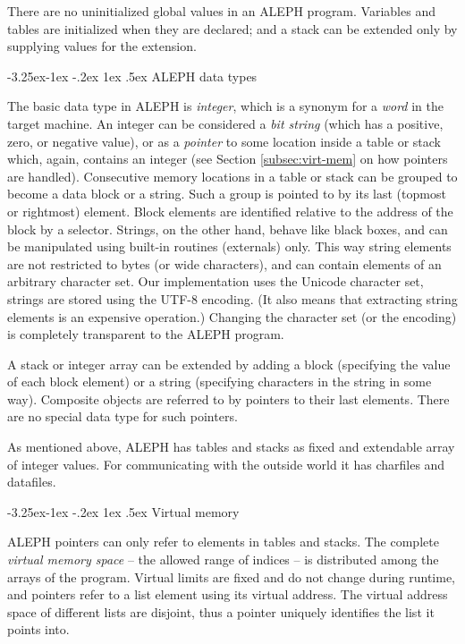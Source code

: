 \documentclass{article}
\makeatletter
\newcommand\A{{\sf ALEPH}}
\newcommand\g[1]{{\sf #1}}
\renewcommand\subsection{%
\@startsection{subsection}{2}{\z@}%
   {-3.25ex\@plus -1ex \@minus -.2ex}%
   {1ex \@plus .5ex}%
   {\normalfont\normalsize\bfseries}}
\makeatother
\begin{document}
There are no uninitialized global values in an \A{} program. Variables and
\g{table}s are initialized when they are declared; and a \g{stack} can be 
extended only by supplying values for the extension.

\subsection{\A{} data types}\label{subsec:blocks}

The basic data type in \A{} is \emph{integer}, which is a synonym for a
\emph{word} in the target machine. An integer can be considered a \emph{bit
string} (which has a positive, zero, or negative value), or as a
\emph{pointer} to some location inside a \g{table} or \g{stack} which,
again, contains an integer (see Section \ref{subsec:virt-mem} on how pointers
are handled). Consecutive memory locations in a \g{table} or \g{stack} can
be grouped to become a data block or a string. Such a group is pointed to by its
last (topmost or rightmost) element. Block elements are identified relative
to the address of the  block by a \g{selector}. Strings, on the other hand, behave
like black boxes, and can be manipulated using built-in routines
(\g{external}s) only. This way string elements are not restricted to bytes
(or wide characters), and can contain elements of an arbitrary character set.
Our implementation uses the Unicode character set, strings are
stored using the UTF-8 encoding. (It also means that extracting string
elements is an expensive operation.) Changing the character set (or the
encoding) is completely transparent to the \A{} program.

A \g{stack} or integer array can be extended by adding a block (specifying
the value of each block element) or a string (specifying characters in
the string in some way). Composite objects are referred to by pointers to
their last elements. There are no special data type for such pointers.

As mentioned above, \A{} has \g{table}s and \g{stack}s as fixed and
extendable array of integer values. For communicating with the outside world
it has \g{charfile}s and \g{datafile}s.

\subsection{Virtual memory}\label{subsec:virt-mem}

\A{} pointers can only refer to elements in \g{table}s and \g{stack}s. The
complete \emph{virtual memory space} -- the allowed range of indices -- is
distributed among the arrays of the program. Virtual limits are fixed
and do not change during runtime, and pointers refer to a list
element using its virtual address. The virtual address space of different lists
are disjoint, thus a pointer uniquely identifies the list it points into.
\end{document}
